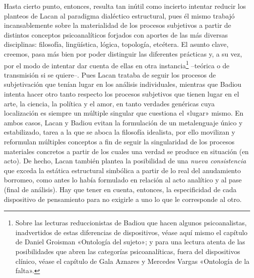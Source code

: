 Hasta cierto punto, entonces, resulta tan inútil como incierto intentar reducir los planteos de Lacan al paradigma dialéctico estructural, pues él mismo trabajó incansablemente sobre la materialidad de los procesos subjetivos a partir de distintos conceptos psicoanalíticos forjados con aportes de las más diversas disciplinas: filosofía, lingüística, lógica, topología, etcétera. El asunto clave, creemos, pasa más bien por poder distinguir las diferentes prácticas y, a su vez, por el modo de intentar dar cuenta de ellas en otra instancia\footnote{Sobre las lecturas reduccionistas de Badiou que hacen algunos psicoanalistas, inadvertidos de estas diferencias de dispositivos, véase aquí mismo el capítulo de Daniel Groisman «Ontología del sujeto»; y para una lectura atenta de las posibilidades que abren las categorías psicoanalíticas, fuera del dispositivos clínico, véase el capítulo de Gala Aznares y Mercedes Vargas «Ontología de la falta».} --teórica o de transmisión si se quiere--. Pues Lacan trataba de seguir los procesos de subjetivación que tenían lugar en los análisis individuales, mientras que Badiou intenta hacer otro tanto respecto los procesos subjetivos que tienen lugar en el arte, la ciencia, la política y el amor, en tanto verdades genéricas cuya localización es siempre un múltiple singular que cuestiona el «lugar» mismo. En ambos casos, Lacan y Badiou evitan la formulación de un metalenguaje único y estabilizado, tarea a la que se aboca la filosofía idealista, por ello movilizan y reformulan múltiples conceptos a fin de seguir la singularidad de los procesos materiales concretos a partir de los cuales una verdad se produce en situación (en acto). De hecho, Lacan también plantea la posibilidad de una \emph{nueva consistencia} que exceda la estática estructural simbólica a partir de lo real del anudamiento borromeo, como antes lo había formulado en relación al acto analítico y al pase (final de análisis). Hay que tener en cuenta, entonces, la especificidad de cada dispositivo de pensamiento para no exigirle a uno lo que le corresponde al otro.


